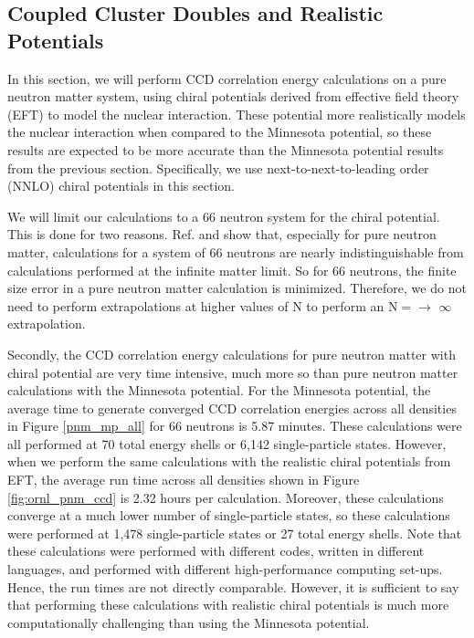 \subsection*{Coupled Cluster Doubles and Realistic Potentials}

In this section, we will perform CCD correlation energy calculations on a pure neutron matter system, using chiral potentials derived from effective field theory (EFT) to model the nuclear interaction. These potential more realistically models the nuclear interaction when compared to the Minnesota potential, so these results are expected to be more accurate than the Minnesota potential results from the previous section. Specifically, we use next-to-next-to-leading order (NNLO) chiral potentials in this section.

We will limit our calculations to a 66 neutron system for the chiral potential. This is done for two reasons. Ref. \cite{Ref8} and \cite{Ref9} show that, especially for pure neutron matter, calculations for a system of 66 neutrons are nearly indistinguishable from calculations performed at the infinite matter limit. So for 66 neutrons, the finite size error in a pure neutron matter calculation is minimized. Therefore, we do not need to perform extrapolations at higher values of N to perform an N$=\longrightarrow$ $\infty$ extrapolation.

Secondly, the CCD correlation energy calculations for pure neutron matter with chiral potential are very time intensive, much more so than pure neutron matter calculations with the Minnesota potential. For the Minnesota potential, the average time to generate converged CCD correlation energies across all densities in Figure \ref{pnm_mp_all} for 66 neutrons is 5.87 minutes. These calculations were all performed at 70 total energy shells or 6,142 single-particle states. However, when we perform the same calculations with the realistic chiral potentials from EFT, the average run time across all densities shown in Figure \ref{fig:ornl_pnm_ccd} is 2.32 hours per calculation. Moreover, these calculations converge at a much lower number of single-particle states, so these calculations were performed at 1,478 single-particle states or 27 total energy shells. Note that these calculations were performed with different codes, written in different languages, and performed with different high-performance computing set-ups. Hence, the run times are not directly comparable. However, it is sufficient to say that performing these calculations with realistic chiral potentials is much more computationally challenging than using the Minnesota potential.

